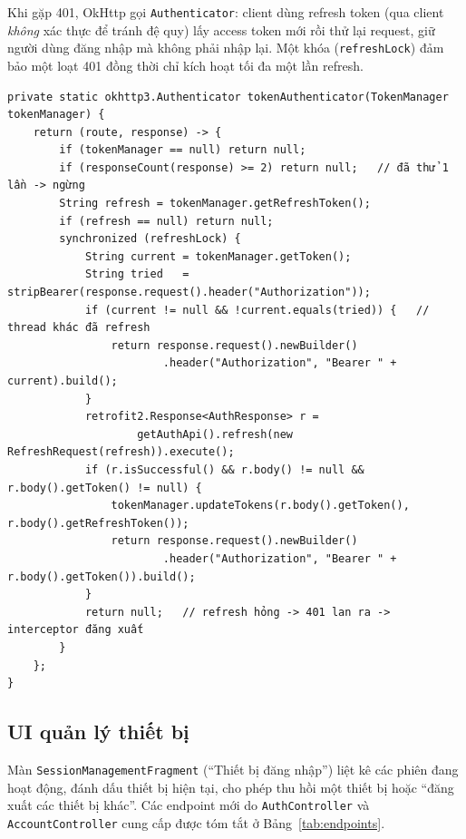 \documentclass[11pt,a4paper]{article}
\begin{document}
Khi gặp 401, OkHttp gọi \texttt{Authenticator}: client dùng refresh token (qua client
\emph{không} xác thực để tránh đệ quy) lấy access token mới rồi thử lại request, giữ người
dùng đăng nhập mà không phải nhập lại. Một khóa (\texttt{refreshLock}) đảm bảo một loạt 401
đồng thời chỉ kích hoạt tối đa một lần refresh.

\begin{lstlisting}[style=java,caption={RetrofitClient -- OkHttp Authenticator tự refresh token}]
private static okhttp3.Authenticator tokenAuthenticator(TokenManager tokenManager) {
    return (route, response) -> {
        if (tokenManager == null) return null;
        if (responseCount(response) >= 2) return null;   // đã thử 1 lần -> ngừng
        String refresh = tokenManager.getRefreshToken();
        if (refresh == null) return null;
        synchronized (refreshLock) {
            String current = tokenManager.getToken();
            String tried   = stripBearer(response.request().header("Authorization"));
            if (current != null && !current.equals(tried)) {   // thread khác đã refresh
                return response.request().newBuilder()
                        .header("Authorization", "Bearer " + current).build();
            }
            retrofit2.Response<AuthResponse> r =
                    getAuthApi().refresh(new RefreshRequest(refresh)).execute();
            if (r.isSuccessful() && r.body() != null && r.body().getToken() != null) {
                tokenManager.updateTokens(r.body().getToken(), r.body().getRefreshToken());
                return response.request().newBuilder()
                        .header("Authorization", "Bearer " + r.body().getToken()).build();
            }
            return null;   // refresh hỏng -> 401 lan ra -> interceptor đăng xuất
        }
    };
}
\end{lstlisting}

\subsection{UI quản lý thiết bị}

Màn \texttt{SessionManagementFragment} (``Thiết bị đăng nhập'') liệt kê các phiên đang hoạt
động, đánh dấu thiết bị hiện tại, cho phép thu hồi một thiết bị hoặc ``đăng xuất các thiết bị
khác''. Các endpoint mới do \texttt{AuthController} và \texttt{AccountController} cung cấp được
tóm tắt ở Bảng~\ref{tab:endpoints}.
\end{document}
